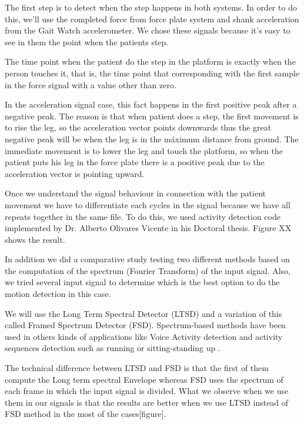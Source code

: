 The first step is to detect when the step happens in both systems. In order to do this, we’ll use the completed force from force plate system and shank acceleration from the Gait Watch accelerometer. We chose these signals because it’s easy to see in them the point when the patients step.

The time point when the patient do the step in the platform is exactly when the person touches it, that is, the time point that corresponding with the first sample in the force signal with a value other than zero.

In the acceleration signal case, this fact happens in the first positive peak after a negative peak. The reason is that when patient does a step, the first movement is to rise the leg, so the acceleration vector points downwards thus the great negative peak will be when the leg is in the máximum distance from ground. The immediate movement is to lower the leg and touch the platform, so when the patient puts his leg in the force plate there is a positive peak due to the acceleration vector is pointing upward.

Once we understand the signal behaviour in connection with the patient movement we have to differentiate each cycles in the signal because we have all repeats together in the same file. To do this, we used activity detection code implemented by Dr. Alberto Olivares Vicente in his Doctoral thesis. Figure XX shows the result.

In addition we did a comparative study testing two different methods based on the  computation of the spectrum (Fourier Transform) of the input signal. Also, we tried several input signal to determine which is the best option to do the motion detection in this case.

We will use the Long Term Spectral Detector (LTSD) \cite{Ramirez2004} and a variation of this called Framed Spectrum Detector (FSD). Spectrum-based methods have been used in others kinds of applications like Voice Activity detection \cite{Ramirez2006}\cite{Ramirez2007} and activity sequences detection such as running or sitting-standing up\cite{A.Olivares2013} .

The technical difference between LTSD and FSD is that the first of them compute the Long term spectral Envelope whereas FSD uses the spectrum of each frame  in which the input signal is divided\cite{A.Olivares2013}. What we observe when we use them in our signals is that the results are better when we use LTSD instead of FSD method  in the most of the cases[figure]. 

